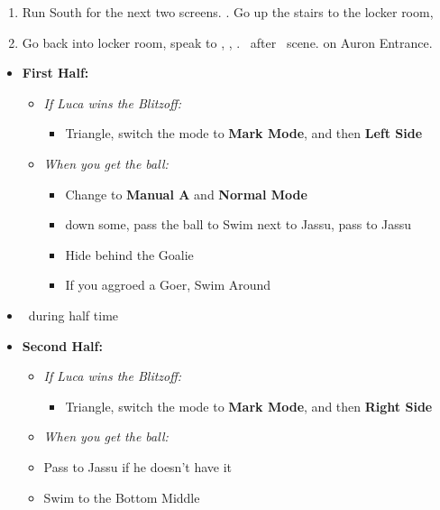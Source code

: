 \begin{enumerate}[resume]
	\item Run South for the next two screens. \save. Go up the stairs to the locker room, \sd
	\item Go back into locker room, speak to \wakka, \sd, \cs[1:20]. \sd\ after \lulu\ scene. \cs[1:40] on Auron Entrance.
\end{enumerate}
\bothvfill\winvfill\lossvfill
\begin{blitzball}
	\begin{itemize}
		\item \textbf{First Half:}
		      \begin{itemize}
			      \item \textit{If Luca wins the Blitzoff:}
			            \begin{itemize}
				            \item Triangle, switch the mode to \textbf{Mark Mode}, and then \textbf{Left Side}
			            \end{itemize}
			      \item \textit{When you get the ball:}
			            \begin{itemize}
				            \item Change to \textbf{Manual A} and \textbf{Normal Mode}
				            \item down some, pass the ball to \tidus
				                  \tidusf Swim next to Jassu, pass to Jassu
				            \item Hide behind the Goalie
				            \item If you aggroed a Goer, Swim Around
			            \end{itemize}
		      \end{itemize}
		\item \sd\ during half time
		\item \textbf{Second Half:}
		      \begin{itemize}
			      \item \textit{If Luca wins the Blitzoff:}
			            \begin{itemize}
				            \item Triangle, switch the mode to \textbf{Mark Mode}, and then \textbf{Right Side}
			            \end{itemize}
			      \item \textit{When you get the ball:}
			      \item Pass to Jassu if he doesn't have it
			      \item Swim to the Bottom Middle

\end{itemize}
\end{itemize}
\end{blitzball}
